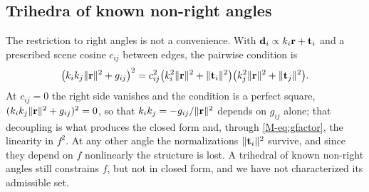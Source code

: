 \subsection{Trihedra of known non-right angles}
The restriction to right angles is not a convenience. With $\mathbf{d}_i\propto k_i\mathbf{r}+\mathbf{t}_i$ and a prescribed scene cosine $c_{ij}$ between edges, the pairwise condition is
\[
\bigl(k_ik_j\|\mathbf{r}\|^2+g_{ij}\bigr)^2=c_{ij}^2\bigl(k_i^2\|\mathbf{r}\|^2+\|\mathbf{t}_i\|^2\bigr)\bigl(k_j^2\|\mathbf{r}\|^2+\|\mathbf{t}_j\|^2\bigr).
\]
At $c_{ij}=0$ the right side vanishes and the condition is a perfect square, $(k_ik_j\|\mathbf{r}\|^2+g_{ij})^2=0$, so that $k_ik_j=-g_{ij}/\|\mathbf{r}\|^2$ depends on $g_{ij}$ alone; that decoupling is what produces the closed form and, through \eqref{M-eq:gfactor}, the linearity in $f^2$. At any other angle the normalizations $\|\mathbf{t}_i\|^2$ survive, and since they depend on $f$ nonlinearly the structure is lost. A trihedral of known non-right angles still constrains $f$, but not in closed form, and we have not characterized its admissible set.





